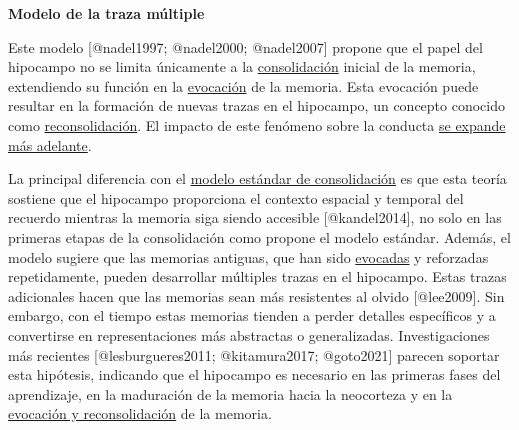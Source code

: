 \documentclass[
  11pt]{../MastersDoctoralThesisUNAM}
\begin{document}
\begin{tcolorbox}[enhanced jigsaw, colframe=quarto-callout-note-color-frame, left=2mm, bottomrule=.15mm, rightrule=.15mm, arc=.35mm, toprule=.15mm, leftrule=.75mm, breakable, opacityback=0, colback=white]

\vspace{-3mm}\textbf{\textbf{Modelo de la traza múltiple}}\vspace{3mm}

Este modelo {[}@nadel1997; @nadel2000; @nadel2007{]} propone que el
papel del hipocampo no se limita únicamente a la
\href{AppendixB.qmd\#term-id-10}{consolidación} inicial de la memoria,
extendiendo su función en la \href{AppendixB.qmd\#term-id-12}{evocación}
de la memoria. Esta evocación puede resultar en la formación de nuevas
trazas en el hipocampo, un concepto conocido como
\href{AppendixB.qmd\#term-id-11}{reconsolidación}. El impacto de este
fenómeno sobre la conducta \hyperref[callout-reconsolidacion]{se expande
más adelante}.

La principal diferencia con el \hyperref[callout-modeloestandar]{modelo
estándar de consolidación} es que esta teoría sostiene que el hipocampo
proporciona el contexto espacial y temporal del recuerdo mientras la
memoria siga siendo accesible {[}@kandel2014{]}, no solo en las primeras
etapas de la consolidación como propone el modelo estándar. Además, el
modelo sugiere que las memorias antiguas, que han sido
\href{AppendixB.qmd\#term-id-12}{evocadas} y reforzadas repetidamente,
pueden desarrollar múltiples trazas en el hipocampo. Estas trazas
adicionales hacen que las memorias sean más resistentes al olvido
{[}@lee2009{]}. Sin embargo, con el tiempo estas memorias tienden a
perder detalles específicos y a convertirse en representaciones más
abstractas o generalizadas. Investigaciones más recientes
{[}@lesburgueres2011; @kitamura2017; @goto2021{]} parecen soportar esta
hipótesis, indicando que el hipocampo es necesario en las primeras fases
del aprendizaje, en la maduración de la memoria hacia la neocorteza y en
la \href{(\#callout-reconsolidacion)}{evocación y reconsolidación} de la
memoria.

\end{tcolorbox}
\end{document}
